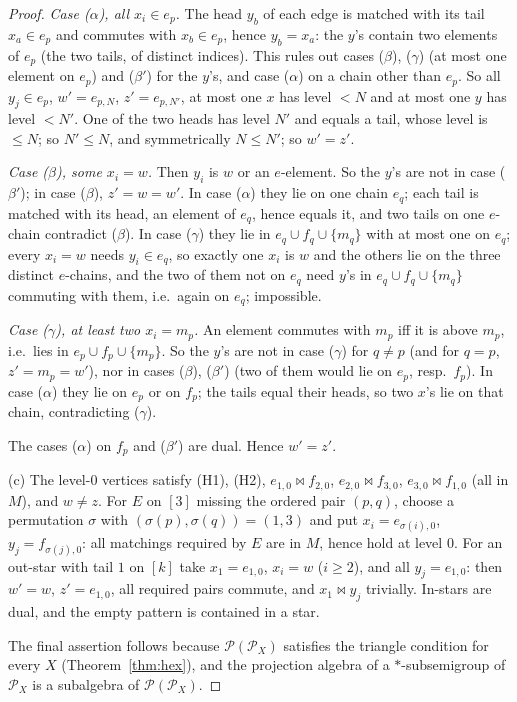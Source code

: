 \documentclass[11pt]{amsart}
\theoremstyle{definition}
\renewcommand{\P}{\mathcal{P}}
\newcommand{\mt}{\bowtie}   %
\begin{document}
\begin{proof}
\emph{Case ($\alpha$), all $x_i\in e_p$.} The head $y_b$ of each edge is matched with its tail $x_a\in e_p$ and commutes with $x_b\in e_p$, hence $y_b=x_a$: the $y$'s contain two elements of $e_p$ (the two tails, of distinct indices). This rules out cases ($\beta$), ($\gamma$) (at most one element on $e_p$) and ($\beta'$) for the $y$'s, and case ($\alpha$) on a chain other than $e_p$. So all $y_j\in e_p$, $w'=e_{p,N}$, $z'=e_{p,N'}$, at most one $x$ has level $<N$ and at most one $y$ has level $<N'$. One of the two heads has level $N'$ and equals a tail, whose level is $\le N$; so $N'\le N$, and symmetrically $N\le N'$; so $w'=z'$.

\emph{Case ($\beta$), some $x_i=w$.} Then $y_i$ is $w$ or an $e$-element. So the $y$'s are not in case ($\beta'$); in case ($\beta$), $z'=w=w'$. In case ($\alpha$) they lie on one chain $e_q$; each tail is matched with its head, an element of $e_q$, hence equals it, and two tails on one $e$-chain contradict ($\beta$). In case ($\gamma$) they lie in $e_q\cup f_q\cup\{m_q\}$ with at most one on $e_q$; every $x_i=w$ needs $y_i\in e_q$, so exactly one $x_i$ is $w$ and the others lie on the three distinct $e$-chains, and the two of them not on $e_q$ need $y$'s in $e_q\cup f_q\cup\{m_q\}$ commuting with them, i.e.\ again on $e_q$; impossible.

\emph{Case ($\gamma$), at least two $x_i=m_p$.} An element commutes with $m_p$ iff it is above $m_p$, i.e.\ lies in $e_p\cup f_p\cup\{m_p\}$. So the $y$'s are not in case ($\gamma$) for $q\ne p$ (and for $q=p$, $z'=m_p=w'$), nor in cases ($\beta$), ($\beta'$) (two of them would lie on $e_p$, resp.\ $f_p$). In case ($\alpha$) they lie on $e_p$ or on $f_p$; the tails equal their heads, so two $x$'s lie on that chain, contradicting ($\gamma$).

The cases ($\alpha$) on $f_p$ and ($\beta'$) are dual. Hence $w'=z'$.

(c) The level-$0$ vertices satisfy (H1), (H2), $e_{1,0}\mt f_{2,0}$, $e_{2,0}\mt f_{3,0}$, $e_{3,0}\mt f_{1,0}$ (all in $M$), and $w\ne z$. For $E$ on $[3]$ missing the ordered pair $(p,q)$, choose a permutation $\sigma$ with $(\sigma(p),\sigma(q))=(1,3)$ and put $x_i=e_{\sigma(i),0}$, $y_j=f_{\sigma(j),0}$: all matchings required by $E$ are in $M$, hence hold at level $0$. For an out-star with tail $1$ on $[k]$ take $x_1=e_{1,0}$, $x_i=w$ ($i\ge2$), and all $y_j=e_{1,0}$: then $w'=w$, $z'=e_{1,0}$, all required pairs commute, and $x_1\mt y_j$ trivially. In-stars are dual, and the empty pattern is contained in a star.

The final assertion follows because $\P(\P_X)$ satisfies the triangle condition for every $X$ (Theorem~\ref{thm:hex}), and the projection algebra of a $*$-subsemigroup of $\P_X$ is a subalgebra of $\P(\P_X)$.
\end{proof}
\end{document}
